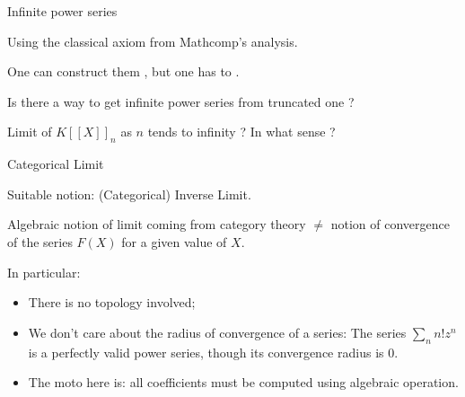 \documentclass[compress,11pt]{beamer}
\renewcommand{\emph}[1]{{\color{red} #1}}
\begin{document}
\begin{frame}{Infinite power series}

  Using the classical axiom from Mathcomp's analysis.
  \bigskip

  \begin{PROBLEM}
    One can construct them , but one has to .
  \end{PROBLEM}
  \bigskip\bigskip\pause

  \begin{QUESTION}
    Is there a way to get infinite power series from truncated one ?
  \end{QUESTION}
  \bigskip\pause

  Limit of $K[[X]]_n$ as $n$ tends to infinity ? In what sense ?
\end{frame}

\begin{frame}[fragile]{Categorical Limit}

  Suitable notion: (Categorical) Inverse Limit.

  \begin{WARN}
    Algebraic notion of limit coming from category theory
    $\neq$ notion of convergence of the series $F(X)$ for a given value of
    $X$.
  \end{WARN}
  \bigskip\paus

  In particular:
  \begin{itemize}
  \item There is \emph{no topology involved};
  \item We \emph{don't care about the radius of convergence} of a series: The
    series $\sum_n n! z^n$ is a perfectly valid power series, though its
    convergence radius is $0$.
  \item The moto here is: all coefficients must be computed using  algebraic operation.
  \end{itemize}
\end{frame}
\end{document}
